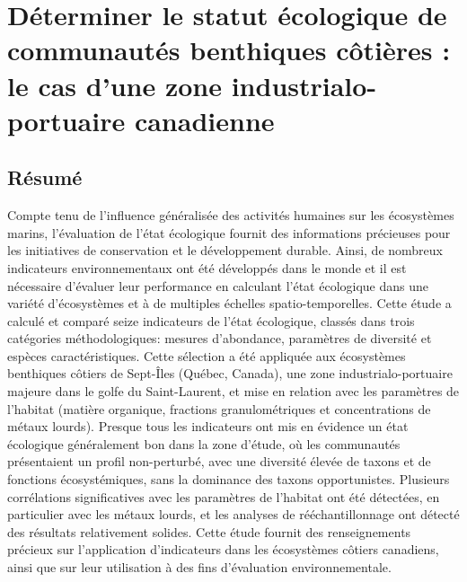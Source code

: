 \chapter{Déterminer le statut écologique de communautés benthiques côtières : le cas d'une zone industrialo-portuaire canadienne}
\label{chap2}

\section{Résumé}
Compte tenu de l'influence généralisée des activités humaines sur les écosystèmes marins, l'évaluation de l'état écologique fournit des informations précieuses pour les initiatives de conservation et le développement durable. Ainsi, de nombreux indicateurs environnementaux ont été développés dans le monde et il est nécessaire d'évaluer leur performance en calculant l'état écologique dans une variété d'écosystèmes et à de multiples échelles spatio-temporelles. Cette étude a calculé et comparé seize indicateurs de l'état écologique, classés dans trois catégories méthodologiques: mesures d'abondance, paramètres de diversité et espèces caractéristiques. Cette sélection a été appliquée aux écosystèmes benthiques côtiers de Sept-Îles (Québec, Canada), une zone industrialo-portuaire majeure dans le golfe du Saint-Laurent, et mise en relation avec les paramètres de l'habitat (matière organique, fractions granulométriques et concentrations de métaux lourds). Presque tous les indicateurs ont mis en évidence un état écologique généralement bon dans la zone d'étude, où les communautés présentaient un profil non-perturbé, avec une diversité élevée de taxons et de fonctions écosystémiques, sans la dominance des taxons opportunistes. Plusieurs corrélations significatives avec les paramètres de l'habitat ont été détectées, en particulier avec les métaux lourds, et les analyses de rééchantillonnage ont détecté des résultats relativement solides. Cette étude fournit des renseignements précieux sur l'application d'indicateurs dans les écosystèmes côtiers canadiens, ainsi que sur leur utilisation à des fins d'évaluation environnementale. \linebreak[4]

